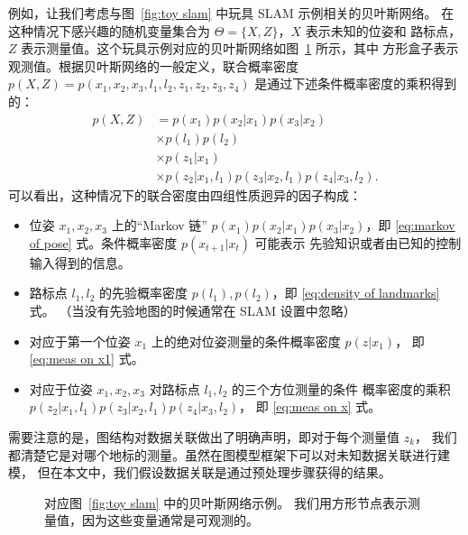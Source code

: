 \documentclass[fontset=none]{Notes}
\begin{document}
例如，让我们考虑与图~\ref{fig:toy slam} 中玩具 SLAM 示例相关的贝叶斯网络。
在这种情况下感兴趣的随机变量集合为 $\Theta=\{X,Z\}$，$X$ 表示未知的位姿和
路标点，$Z$ 表示测量值。这个玩具示例对应的贝叶斯网络如图~\ref{fig:bayes net of toy slam} 所示，其中
方形盒子表示观测值。根据贝叶斯网络的一般定义，联合概率密度
$p(X,Z)=p(x_1,x_2,x_3,l_1,l_2,z_1,z_2,z_3,z_4)$ 是通过下述条件概率密度的乘积得到的：
\begin{align}
  p(X,Z)&=p(x_1)p(x_2|x_1)p(x_3|x_2)\label{eq:markov of pose}\\
  &\times p(l_1)p(l_2) \label{eq:density of landmarks}\\
  &\times p(z_1|x_1) \label{eq:meas on x1}\\
  &\times p(z_2|x_1,l_1)p(z_3|x_2,l_1)p(z_4|x_3,l_2). \label{eq:meas on x}
\end{align}
可以看出，这种情况下的联合密度由四组性质迥异的因子构成：
\begin{itemize}
  \item 位姿 $x_1,x_2,x_3$ 上的“Markov 链” $p(x_1)p(x_2|x_1)p(x_3|x_2)$，即 
  \eqref{eq:markov of pose} 式。条件概率密度 $p(x_{t+1}|x_t)$ 可能表示
  先验知识或者由已知的控制输入得到的信息。
  \item 路标点 $l_1,l_2$ 的先验概率密度 $p(l_1),p(l_2)$，即 \eqref{eq:density of landmarks} 式。
  （当没有先验地图的时候通常在 SLAM 设置中忽略）
  \item 对应于第一个位姿 $x_1$ 上的绝对位姿测量的条件概率密度 $p(z|x_1)$，
  即 \eqref{eq:meas on x1} 式。
  \item 对应于位姿 $x_1,x_2,x_3$ 对路标点 $l_1,l_2$ 的三个方位测量的条件
  概率密度的乘积 $p(z_2|x_1,l_1)p(z_3|x_2,l_1)p(z_4|x_3,l_2)$，
  即 \eqref{eq:meas on x} 式。
\end{itemize}

需要注意的是，图结构对数据关联做出了明确声明，即对于每个测量值 $z_k$，
我们都清楚它是对哪个地标的测量。虽然在图模型框架下可以对未知数据关联进行建模，
但在本文中，我们假设数据关联是通过预处理步骤获得的结果。

\begin{figure}[htb]
  \centering
  \caption{对应图~\ref{fig:toy slam} 中的贝叶斯网络示例。
  我们用方形节点表示测量值，因为这些变量通常是可观测的。}\label{fig:bayes net of toy slam}
\end{figure}
\end{document}
